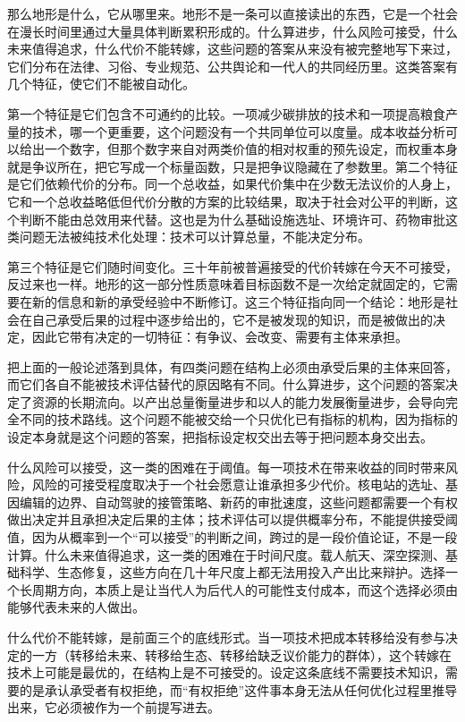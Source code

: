 
那么地形是什么，它从哪里来。地形不是一条可以直接读出的东西，它是一个社会在漫长时间里通过大量具体判断累积形成的。什么算进步，什么风险可接受，什么未来值得追求，什么代价不能转嫁，这些问题的答案从来没有被完整地写下来过，它们分布在法律、习俗、专业规范、公共舆论和一代人的共同经历里。这类答案有几个特征，使它们不能被自动化。

第一个特征是它们包含不可通约的比较。一项减少碳排放的技术和一项提高粮食产量的技术，哪一个更重要，这个问题没有一个共同单位可以度量。成本收益分析可以给出一个数字，但那个数字来自对两类价值的相对权重的预先设定，而权重本身就是争议所在，把它写成一个标量函数，只是把争议隐藏在了参数里。第二个特征是它们依赖代价的分布。同一个总收益，如果代价集中在少数无法议价的人身上，它和一个总收益略低但代价分散的方案的比较结果，取决于社会对公平的判断，这个判断不能由总效用来代替。这也是为什么基础设施选址、环境许可、药物审批这类问题无法被纯技术化处理：技术可以计算总量，不能决定分布。

第三个特征是它们随时间变化。三十年前被普遍接受的代价转嫁在今天不可接受，反过来也一样。地形的这一部分性质意味着目标函数不是一次给定就固定的，它需要在新的信息和新的承受经验中不断修订。这三个特征指向同一个结论：地形是社会在自己承受后果的过程中逐步给出的，它不是被发现的知识，而是被做出的决定，因此它带有决定的一切特征：有争议、会改变、需要有主体来承担。


把上面的一般论述落到具体，有四类问题在结构上必须由承受后果的主体来回答，而它们各自不能被技术评估替代的原因略有不同。什么算进步，这个问题的答案决定了资源的长期流向。以产出总量衡量进步和以人的能力发展衡量进步，会导向完全不同的技术路线。这个问题不能被交给一个只优化已有指标的机构，因为指标的设定本身就是这个问题的答案，把指标设定权交出去等于把问题本身交出去。

什么风险可以接受，这一类的困难在于阈值。每一项技术在带来收益的同时带来风险，风险的可接受程度取决于一个社会愿意让谁承担多少代价。核电站的选址、基因编辑的边界、自动驾驶的接管策略、新药的审批速度，这些问题都需要一个有权做出决定并且承担决定后果的主体；技术评估可以提供概率分布，不能提供接受阈值，因为从概率到一个“可以接受”的判断之间，跨过的是一段价值论证，不是一段计算。什么未来值得追求，这一类的困难在于时间尺度。载人航天、深空探测、基础科学、生态修复，这些方向在几十年尺度上都无法用投入产出比来辩护。选择一个长周期方向，本质上是让当代人为后代人的可能性支付成本，而这个选择必须由能够代表未来的人做出。

什么代价不能转嫁，是前面三个的底线形式。当一项技术把成本转移给没有参与决定的一方（转移给未来、转移给生态、转移给缺乏议价能力的群体），这个转嫁在技术上可能是最优的，在结构上是不可接受的。设定这条底线不需要技术知识，需要的是承认承受者有权拒绝，而“有权拒绝”这件事本身无法从任何优化过程里推导出来，它必须被作为一个前提写进去。

